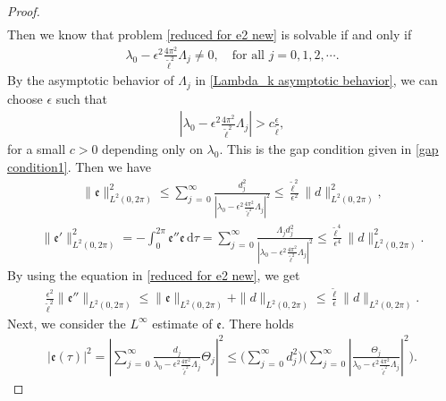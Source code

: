 \documentclass[10pt, reqno]{amsart}
\numberwithin{equation}{section}
\theoremstyle{definition}
\begin{document}
{\begin{proof}
\begin{align*}
\end{align*}
 Then we know that problem \eqref{reduced for e2 new} is solvable if and only if
\begin{align*}
\lambda_0 - \epsilon^2\frac{4\pi^2}{{\tilde\ell}^2}\Lambda_j \ne 0, \quad \text{for all $j=0, 1, 2, \cdots$}.
\end{align*}
By the asymptotic behavior of $\Lambda_j$ in \eqref{Lambda_k asymptotic behavior}, we can choose $\epsilon$ such that
\begin{align*}
\left|\lambda_0 - \epsilon^2\frac{4\pi^2}{{\tilde\ell}^2}\Lambda_j \right| >c \frac\epsilon {\tilde\ell},
\end{align*}
for a small $c>0$ depending only on $\lambda_0$.
This is the gap condition given in \eqref{gap condition1}.
Then we have
\begin{align*}
\|{\mathfrak e}\|_{L^2(0, 2\pi)}^2 \leq \sum_{j \,=\, 0}^\infty \frac{d_j^2} {\left|\lambda_0 - \epsilon^2\frac{4\pi^2}{{\tilde\ell}^2}\Lambda_j\right|^2} \leq \frac {{\tilde\ell}^2}{\epsilon^2} \|d\|_{L^2(0, 2\pi)}^2,
\end{align*}
\begin{align*}
\|{\mathfrak e}'\|_{L^2(0, 2\pi)}^2
= - \int_0^{2\pi} {\mathfrak e}'' {\mathfrak e} \,{\mathrm d}\tau
= \sum_{j \,=\, 0}^\infty
\frac{\Lambda_j d_j^2}{\left|\lambda_0 -\epsilon^2\frac{4\pi^2}{{\tilde\ell}^2}\Lambda_j\right|^2}
\leq
\frac {{\tilde\ell}^4}{\epsilon^4} \|d\|_{L^2(0, 2\pi)}^2.
\end{align*}
By using the equation in \eqref{reduced for e2 new}, we get
\begin{align*}
\frac{\epsilon^2}{{\tilde\ell}^2} \|{\mathfrak e}''\|_{L^2(0, 2\pi)}
\le
\|{\mathfrak e}\|_{L^2(0, 2\pi)} + \|d\|_{L^2(0, 2\pi)}
\le
\frac {{\tilde\ell}}{\epsilon} \|d\|_{L^2(0, 2\pi)}.
\end{align*}
Next, we consider the $L^\infty$ estimate of ${\mathfrak e}$.
There holds
\begin{align*}
|{\mathfrak e}(\tau)|^2
= \left|\sum_{j \,=\, 0}^\infty \frac{d_j} {\lambda_0 - \epsilon^2\frac{4\pi^2}{{\tilde\ell}^2}\Lambda_j} \Theta_j\right|^2
\le
\Bigg(\sum_{j \,=\, 0}^\infty d_j^2 \Bigg)\Bigg(\sum_{j \,=\, 0}^\infty \left|\frac{ \Theta_j} {\lambda_0 - \epsilon^2\frac{4\pi^2}{{\tilde\ell}^2}\Lambda_j} \right|^2\Bigg).
\end{align*}


\end{proof}}
\end{document}
